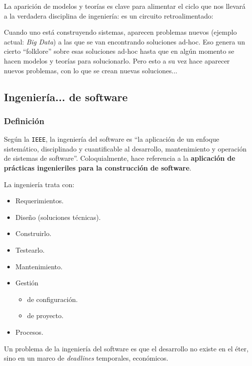 \documentclass[]{article}
\begin{document}
La aparición de modelos y teorías es clave para alimentar el ciclo que nos llevará a la verdadera disciplina de ingeniería: es un circuito retroalimentado:

Cuando uno está construyendo sistemas, aparecen problemas nuevos (ejemplo actual: \emph{Big Data}) a las que se van encontrando soluciones ad-hoc. Eso genera un cierto ``folklore'' sobre esas soluciones ad-hoc hasta que en algún momento se hacen modelos y teorías para solucionarlo. Pero esto a su vez hace aparecer nuevos problemas, con lo que se crean nuevas soluciones...

\subsection{Ingeniería... de software}
\subsubsection{Definición}
Según la \texttt{IEEE}, la ingeniería del software es ``la aplicación de un enfoque sistemático, disciplinado y cuantificable al desarrollo, mantenimiento y operación de sistemas de software''. Coloquialmente, hace referencia a la \textbf{aplicación de prácticas ingenieriles para la construcción de software}.

La ingeniería trata con:
\begin{itemize}
	\item Requerimientos.
	\item Diseño (soluciones técnicas).
	\item Construirlo.
	\item Testearlo.
	\item Mantenimiento.
	\item Gestión
	\begin{itemize}
		\item de configuración.
		\item de proyecto.
	\end{itemize}
	\item Procesos.
\end{itemize}

Un problema de la ingeniería del software es que el desarrollo no existe en el éter, sino en un marco de \emph{deadlines} temporales, económicos.
\end{document}

